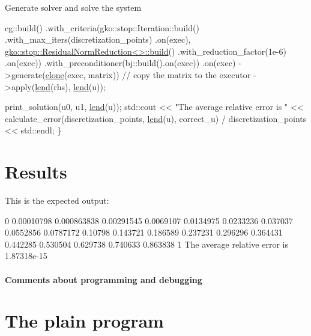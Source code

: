 Generate solver and solve the system


\begin{DoxyCode}
    cg::build()
        .with\_criteria(gko::stop::Iteration::build()
                           .with\_max\_iters(discretization\_points)
                           .on(exec),
                       \hyperlink{classgko_1_1stop_1_1ResidualNormReduction}{gko::stop::ResidualNormReduction<>::build}()
                           .with\_reduction\_factor(1e-6)
                           .on(exec))
        .with\_preconditioner(bj::build().on(exec))
        .on(exec)
        ->generate(\hyperlink{namespacegko_a1beb80750459e4201aa9d882d2d074c3}{clone}(exec, matrix))  \textcolor{comment}{// copy the matrix to the executor}
        ->apply(\hyperlink{namespacegko_aa8cb4876b72e5e1036ea9575443c439b}{lend}(rhs), \hyperlink{namespacegko_aa8cb4876b72e5e1036ea9575443c439b}{lend}(u));

    print\_solution(u0, u1, \hyperlink{namespacegko_aa8cb4876b72e5e1036ea9575443c439b}{lend}(u));
    std::cout << \textcolor{stringliteral}{"The average relative error is "}
              << calculate\_error(discretization\_points, \hyperlink{namespacegko_aa8cb4876b72e5e1036ea9575443c439b}{lend}(u), correct\_u) /
                     discretization\_points
              << std::endl;
\}
\end{DoxyCode}
 \label{_Results}%
\section*{Results}

This is the expected output\+:


\begin{DoxyCode}
0
0.00010798
0.000863838
0.00291545
0.0069107
0.0134975
0.0233236
0.037037
0.0552856
0.0787172
0.10798
0.143721
0.186589
0.237231
0.296296
0.364431
0.442285
0.530504
0.629738
0.740633
0.863838
1
The average relative error is 1.87318e-15
\end{DoxyCode}


\label{_Commentsaboutprogramminganddebugging}%
\paragraph*{Comments about programming and debugging }

\label{_PlainProg}%
 \section*{The plain program}


